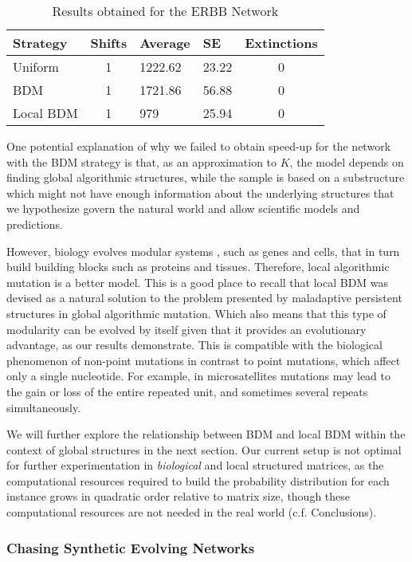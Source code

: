 \documentclass[10pt]{article}
\begin{document}
\begin{table}[h]
    \centering
    \caption{Results obtained for the ERBB Network}
    \label{erbbTL}
    \begin{tabular}[]{@{}lcllc@{}}
        \hline
        Strategy & Shifts & Average & SE & Extinctions\\
        \hline
        Uniform & 1 & 1222.62 & 23.22 & 0 \\
        BDM & 1 & 1721.86 & 56.88 & 0\\
        Local BDM & 1 & 979 & 25.94 & 0\\
        \hline
    \end{tabular}
\end{table}

One potential explanation of why we failed to obtain speed-up for the network with the BDM strategy is that, as an approximation to $K$, the model depends on finding global algorithmic structures, while the sample is based on a substructure which might not have enough information about the underlying structures that we hypothesize govern the natural world and allow scientific models and predictions.

However, biology evolves modular systems \cite{mitra2013integrative}, such as genes and cells, that in turn build building blocks such as proteins and tissues. Therefore, local algorithmic mutation is a better model. This is a good place to recall that local BDM was devised as a natural solution to the problem presented by maladaptive persistent structures in global algorithmic mutation. Which also means that this type of modularity can be evolved by itself given that it provides an evolutionary advantage, as our results demonstrate. This is compatible with the biological phenomenon of non-point mutations in contrast to point mutations, which affect only a single nucleotide. For example, in microsatellites mutations may lead to the gain or loss of the entire repeated unit, and sometimes several repeats simultaneously.

We will further explore the relationship between BDM and local BDM within the context of global structures in the next section. Our current setup is not optimal for further experimentation in \textit{biological} and local structured matrices, as the computational resources required to build the probability distribution for each instance grows in quadratic order relative to matrix size, though these computational resources are not needed in the real world (c.f. Conclusions). 


\subsubsection{Chasing Synthetic Evolving Networks}
\end{document}

